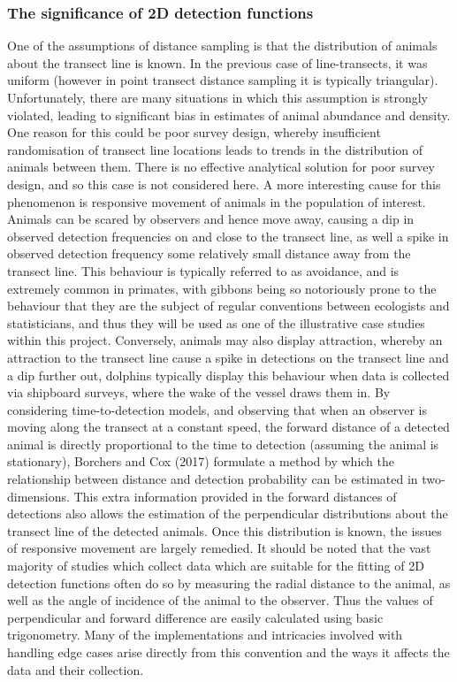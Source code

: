 \documentclass[11pt]{article}
\begin{document}
\begin{multicols}{2}
\subsubsection{The significance of 2D detection functions}

One of the assumptions of distance sampling is that the distribution of animals about the transect line is known. In the previous case of line-transects, it was uniform (however in point transect distance sampling it is typically triangular). Unfortunately, there are many situations in which this assumption is strongly violated, leading to significant bias in estimates of animal abundance and density. One reason for this could be poor survey design, whereby insufficient randomisation of transect line locations leads to trends in the distribution of animals between them. There is no effective analytical solution for poor survey design, and so this case is not considered here. A more interesting cause for this phenomenon is responsive movement of animals in the population of interest. Animals can be scared by observers and hence move away, causing a dip in observed detection frequencies on and close to the transect line, as well a spike in observed detection frequency some relatively small distance away from the transect line. This behaviour is typically referred to as avoidance, and is extremely common in primates, with gibbons being so notoriously prone to the behaviour that they are the subject of regular conventions between ecologists and statisticians, and thus they will be used as one of the illustrative case studies within this project. Conversely, animals may also display attraction, whereby an attraction to the transect line cause a spike in detections on the transect line and a dip further out, dolphins typically display this behaviour when data is collected via shipboard surveys, where the wake of the vessel draws them in.
By considering time-to-detection models, and observing that when an observer is moving along the transect at a constant speed, the forward distance of a detected animal is directly proportional to the time to detection (assuming the animal is stationary), Borchers and Cox (2017) formulate a method by which the relationship between distance and detection probability can be estimated in two-dimensions. This extra information provided in the forward distances of detections also allows the estimation of the perpendicular distributions about the transect line of the detected animals. Once this distribution is known, the issues of responsive movement are largely remedied. It should be noted that the vast majority of studies which collect data which are suitable for the fitting of 2D detection functions often do so by measuring the radial distance to the animal, as well as the angle of incidence of the animal to the observer. Thus the values of perpendicular and forward difference are easily calculated using basic trigonometry. Many of the implementations and intricacies involved with handling edge cases arise directly from this convention and the ways it affects the data and their collection.


\end{multicols}
\end{document}
